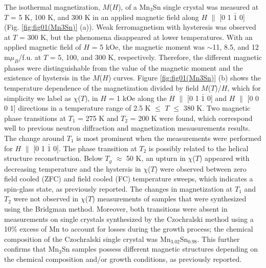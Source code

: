 \documentclass[prb,twocolumn,showpacs,preprintnumbers,amsmath,amssymb]{revtex4}
\begin{document}
The isothermal magnetization, $M$($H$), of a Mn$_3$Sn single crystal was measured at $T$ = 5 K, 100 K, and 300 K in an applied magnetic field along $H$ $\parallel$ [0 1 $\bar{1}$ 0] (Fig. \ref{fig:fig01(Mn3Sn)} (a)). 
Weak ferromagnetism with hysteresis was observed at $T$ = 300 K, 
but the phenomena disappeared at lower temperatures. 
With an applied magnetic field of $H$ = 5 kOe, the magnetic moment was $\sim$11, 8.5, and 12 m$\mu_B$/f.u. at $T$ = 5, 100, and 300 K, respectively.
Therefore, the different magnetic phases were distinguishable from the value of the magnetic moment and the existence of hystersis in the $M$($H$) curves. 	
Figure \ref{fig:fig01(Mn3Sn)} (b) shows the temperature dependence of the magnetization divided by field $M$($T$)/$H$, which for simplicity we label as $\chi$($T$), in  $H$ = 1 kOe along the $H$ $\parallel$ [0 1 $\bar{1}$ 0] and $H$ $\parallel$ [0 0 0 1] directions in a temperature range of 2.5 K $\leq$ $T$ $\leq$ 380 K. 
Two magnetic phase transitions at $T_1$ = 275 K and $T_2$ = 200 K were found, which correspond well to previous neutron diffraction and magnetization meausurements results.\cite{Nagamiya1979, Ohmori1987}
The change around $T_1$ is most prominent when the measurements were performed for $H$ $\parallel$ [0 1 $\bar{1}$ 0].
The phase transition at $T_2$ is possibly related to the helical structure reconstruction.\cite{APL2015} 
Below $T_g$ $\approx$ 50 K, an upturn in $\chi$($T$) appeared with decreasing temperature  and the hystersis in $\chi$($T$) were observed  between zero field cooled (ZFC) and field cooled (FC) temperature sweeps, which indicates a spin-glass state, as previously reported. \cite{PRBglass2006} 
The changes in magnetization at $T_1$ and $T_2$ were not observed in $\chi$($T$) measurements of samples that were synthesized using the Bridgman method.\cite{PJBrown, JMMM54}
Moreover, both transitions were absent in measurements on single crystals synthesized by the Czochralski method using a 10\% excess of Mn to account for losses during the growth process; the chemical composition of the Czochralski single crystal was Mn$_{3.02}$Sn$_{0.98}$.\cite{Nakatsuji2015}
This further confirms that Mn$_3$Sn samples possess different magnetic structures depending on the chemical composition and/or growth conditions, as previously reported.\cite{1972, 1975}
\end{document}
